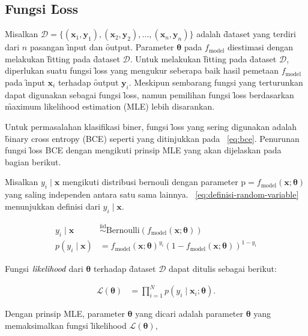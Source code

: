     \subsection{Fungsi \f{Loss}}
    Misalkan $\mathcal{D} = \{(\mathbf{x}_1, \mathbf{y}_1), (\mathbf{x}_2, \mathbf{y}_2), \dots, (\mathbf{x}_n, \mathbf{y}_n)\}$ adalah \f{dataset} yang terdiri dari $n$ pasangan \f{input} dan \f{output}. Parameter $\bm{\theta}$ pada $f_{\text{model}}$ diestimasi dengan melakukan \f{fitting} pada \f{dataset} $\mathcal{D}$. Untuk melakukan \f{fitting} pada \f{dataset} $\mathcal{D}$, diperlukan suatu fungsi \f{loss} yang mengukur seberapa baik hasil pemetaan $f_{\text{model}}$ pada \f{input} $\mathbf{x}_i$ terhadap \f{output} $\mathbf{y}_i$. Meskipun sembarang fungsi yang terturunkan dapat digunakan sebagai fungsi \f{loss}, namun pemilihan fungsi \f{loss} berdasarkan \f{maximum likelihood estimation} (MLE) lebih disarankan. 
    
    Untuk permasalahan klasifikasi biner, fungsi \f{loss} yang sering digunakan adalah \f{binary cross entropy} (BCE) seperti yang ditinjukkan pada \equ~\ref{eq:bce}. Penurunan fungsi \f{loss} BCE dengan mengikuti prinsip MLE yang akan dijelaskan pada bagian berikut.
    
    Misalkan $y_i \mid \mathbf{x}$ mengikuti distribusi bernouli dengan parameter $\text{p} = f_{\text{model}}(\mathbf{x};\bm{\theta})$ yang saling independen antara satu sama lainnya. \equ~\ref{eq:definisi-random-variable} menunjukkan definisi dari $y_i \mid \mathbf{x}$.

    \begin{align}
        \label{eq:definisi-random-variable}
        y_i \mid \mathbf{x} &\overset{\text{iid}}{\sim} \text{Bernoulli}(f_{\text{model}}(\mathbf{x};\bm{\theta})) \\
        p(y_i \mid \mathbf{x}) &= f_{\text{model}}(\mathbf{x};\bm{\theta})^{y_i} (1 - f_{\text{model}}(\mathbf{x};\bm{\theta}))^{1 - y_i} 
    \end{align} 

    Fungsi $\textit{likelihood}$ dari $\bm{\theta}$ terhadap \f{dataset} $\mathcal{D}$ dapat ditulis sebagai berikut:

    \begin{align}
        \mathcal{L}(\bm{\theta}) &= \prod_{i=1}^N p(y_i \mid \mathbf{x}_i; \bm{\theta}).
    \end{align}

    Dengan prinsip MLE, parameter $\bm{\theta}$ yang dicari adalah parameter $\bm{\theta}$ yang memaksimalkan fungsi \f{likelihood} $\mathcal{L}(\bm{\theta})$,

